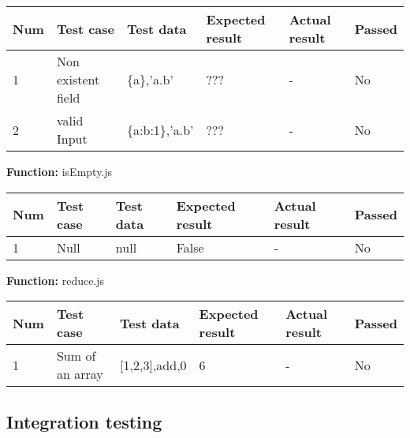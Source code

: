 \documentclass[a4paper, 12pt]{article}
\begin{document}
        \begin{table}[h!]
            \begin{tabular}{|l|l|l|l|l|l|}
                \hline
                Num & Test case        					& Test data 					& Expected result 					& Actual result 		& Passed \\ \hline
                1   & Non  existent field 				& \{a\},'a.b'     				& ???               				& -             		& No     \\ \hline
                2   & valid Input 						& \{a:b:1\},'a.b'     			& ???               				& -             		& No     \\ \hline
            \end{tabular}
        \end{table}
    
        \textbf{Function:} isEmpty.js
        
        \begin{table}[h!]
            \begin{tabular}{|l|l|l|l|l|l|}
                \hline
                Num & Test case         						& Test data 					& Expected result 					& Actual result 		& Passed \\ \hline
                1   & Null 										& null     						& False                				& -             		& No     \\ \hline
            \end{tabular}
        \end{table}
    
        \textbf{Function:} reduce.js
        
        \begin{table}[h!]
            \begin{tabular}{|l|l|l|l|l|l|}
                \hline
                Num & Test case        					& Test data 					& Expected result 					& Actual result 		& Passed \\ \hline
                1   & Sum of an array 					& {[}1,2,3{]},add,0     		& 6                					& -             		& No     \\ \hline
            \end{tabular}
        \end{table}
    
    \newpage

    \subsection{Integration testing}
\end{document}
